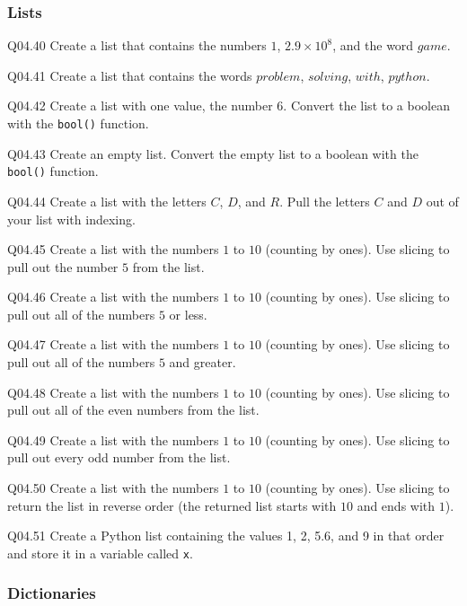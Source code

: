 \documentclass{book}
\newcommand{\passthrough}[1]{#1}
\begin{document}
    
        \hypertarget{lists}{%
\subsubsection{Lists}\label{lists}}

Q04.40 Create a list that contains the numbers \(1\),
\(2.9 \times 10^8\), and the word \(game\).

Q04.41 Create a list that contains the words \(problem\), \(solving\),
\(with\), \(python\).

Q04.42 Create a list with one value, the number \(6\). Convert the list
to a boolean with the \passthrough{\lstinline!bool()!} function.

Q04.43 Create an empty list. Convert the empty list to a boolean with
the \passthrough{\lstinline!bool()!} function.

Q04.44 Create a list with the letters \(C\), \(D\), and \(R\). Pull the
letters \(C\) and \(D\) out of your list with indexing.

Q04.45 Create a list with the numbers \(1\) to \(10\) (counting by
ones). Use slicing to pull out the number \(5\) from the list.

Q04.46 Create a list with the numbers \(1\) to \(10\) (counting by
ones). Use slicing to pull out all of the numbers \(5\) or less.

Q04.47 Create a list with the numbers \(1\) to \(10\) (counting by
ones). Use slicing to pull out all of the numbers \(5\) and greater.

Q04.48 Create a list with the numbers \(1\) to \(10\) (counting by
ones). Use slicing to pull out all of the even numbers from the list.

Q04.49 Create a list with the numbers \(1\) to \(10\) (counting by
ones). Use slicing to pull out every odd number from the list.

Q04.50 Create a list with the numbers \(1\) to \(10\) (counting by
ones). Use slicing to return the list in reverse order (the returned
list starts with \(10\) and ends with \(1\)).

Q04.51 Create a Python list containing the values 1, 2, 5.6, and 9 in
that order and store it in a variable called
\passthrough{\lstinline!x!}.
    




    
        \hypertarget{dictionaries}{%
\subsubsection{Dictionaries}\label{dictionaries}}
\end{document}
